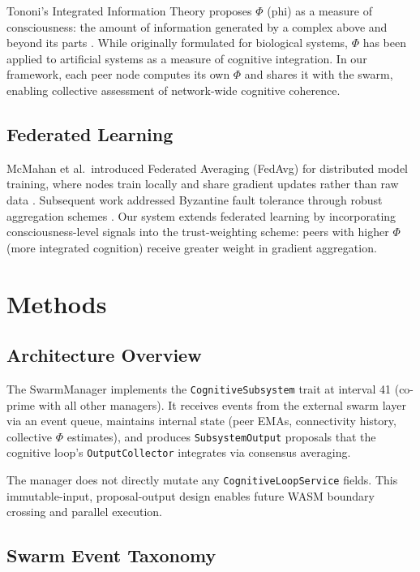 \documentclass[11pt,a4paper]{article}
\begin{document}
Tononi's Integrated Information Theory proposes $\Phi$ (phi) as a measure of consciousness: the amount of information generated by a complex above and beyond its parts \citep{tononi2004}. While originally formulated for biological systems, $\Phi$ has been applied to artificial systems as a measure of cognitive integration. In our framework, each peer node computes its own $\Phi$ and shares it with the swarm, enabling collective assessment of network-wide cognitive coherence.

\subsection{Federated Learning}

McMahan et al.\ introduced Federated Averaging (FedAvg) for distributed model training, where nodes train locally and share gradient updates rather than raw data \citep{mcmahan2017}. Subsequent work addressed Byzantine fault tolerance through robust aggregation schemes \citep{blanchard2017}. Our system extends federated learning by incorporating consciousness-level signals into the trust-weighting scheme: peers with higher $\Phi$ (more integrated cognition) receive greater weight in gradient aggregation.

\section{Methods}

\subsection{Architecture Overview}

The SwarmManager implements the \texttt{CognitiveSubsystem} trait at interval 41 (co-prime with all other managers). It receives events from the external swarm layer via an event queue, maintains internal state (peer EMAs, connectivity history, collective $\Phi$ estimates), and produces \texttt{SubsystemOutput} proposals that the cognitive loop's \texttt{OutputCollector} integrates via consensus averaging.

The manager does not directly mutate any \texttt{CognitiveLoopService} fields. This immutable-input, proposal-output design enables future WASM boundary crossing and parallel execution.

\subsection{Swarm Event Taxonomy}
\end{document}
